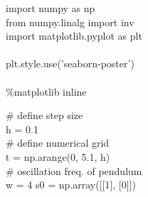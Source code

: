 \begin{mysolution}     
\begin{boxB}
import numpy as np\\
from numpy.linalg import inv\\
import matplotlib.pyplot as plt\\
\\
plt.style.use('seaborn-poster')\\
\\
\%matplotlib inline 
\end{boxB}
%
\begin{boxB}
\# define step size\\
h = 0.1\\
\# define numerical grid\\
t = np.arange(0, 5.1, h)\\
\# oscillation freq. of pendulum\\
w = 4
s0 = np.array([[1], [0]])
\end{boxB}


\end{mysolution}
